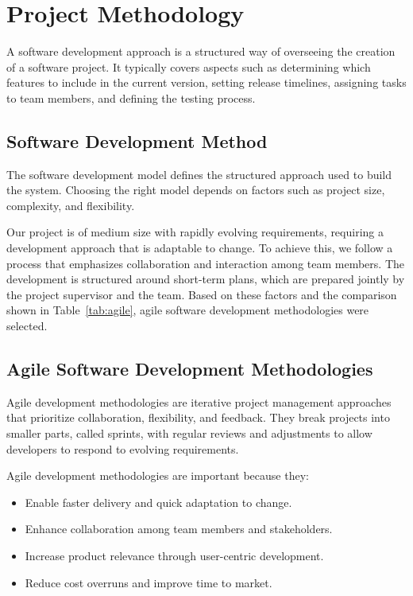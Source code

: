 \section{Project Methodology}
A software development approach is a structured way of overseeing the creation of a software project. It typically covers aspects such as determining which features to include in the current version, setting release timelines, assigning tasks to team members, and defining the testing process.

\subsection{Software Development Method}
The software development model defines the structured approach used to build the system. Choosing the right model depends on factors such as project size, complexity, and flexibility.

Our project is of medium size with rapidly evolving requirements, requiring a development approach that is adaptable to change. To achieve this, we follow a process that emphasizes collaboration and interaction among team members. The development is structured around short-term plans, which are prepared jointly by the project supervisor and the team. Based on these factors and the comparison shown in Table~\ref{tab:agile}, agile software development methodologies were selected.

\subsection{Agile Software Development Methodologies}
Agile development methodologies are iterative project management approaches that prioritize collaboration, flexibility, and feedback. They break projects into smaller parts, called sprints, with regular reviews and adjustments to allow developers to respond to evolving requirements.

Agile development methodologies are important because they:
\begin{itemize}
    \item Enable faster delivery and quick adaptation to change.
    \item Enhance collaboration among team members and stakeholders.
    \item Increase product relevance through user-centric development.
    \item Reduce cost overruns and improve time to market.
\end{itemize}

